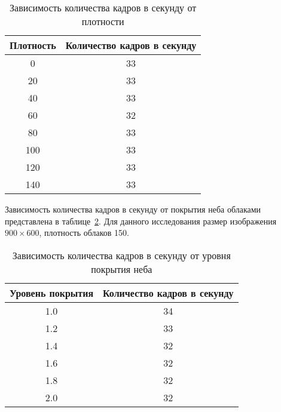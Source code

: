\begin{table}[H]
	\begin{center}
		\begin{threeparttable}
			\captionsetup{justification=raggedright,singlelinecheck=off}
			\caption{Зависимость количества кадров в секунду от плотности}
			\label{tbl:densfps}
			\begin{tabular}{|c|c|}
				\hline
				Плотность &  Количество кадров в секунду \\
				\hline
					0 & 33 \\
					\hline
					20 & 33 \\
					\hline
					40 & 33 \\
					\hline
					60 & 32 \\
					\hline
					80 & 33 \\
					\hline
					100 & 33 \\
					\hline
					120 & 33 \\
					\hline
					140 & 33 \\
				\hline
			\end{tabular}
		\end{threeparttable}
	\end{center}
\end{table}


Зависимость количества кадров в секунду от покрытия неба облаками представлена в таблице~\ref{tbl:covfps}. Для данного исследования размер изображения $900 \times 600$, плотность облаков 150.

\begin{table}[H]
	\begin{center}
		\begin{threeparttable}
			\captionsetup{justification=raggedright,singlelinecheck=off}
			\caption{Зависимость количества кадров в секунду от уровня покрытия неба}
			\label{tbl:covfps}
			\begin{tabular}{|c|c|}
				\hline
				Уровень покрытия &  Количество кадров в секунду \\
					\hline
				1.0 & 34 \\
				\hline
				1.2 & 33 \\
				\hline
				1.4 & 32 \\
				\hline
				1.6 & 32 \\
				\hline
				1.8 & 32 \\
				\hline
				2.0 & 32 \\
				\hline
			\end{tabular}
		\end{threeparttable}
	\end{center}
\end{table}


